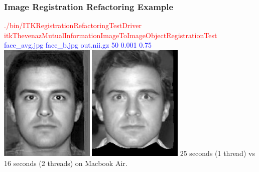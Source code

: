 \begin{frame}
\frametitle{Image Registration Refactoring Example}
\textcolor{red}{./bin/ITKRegistrationRefactoringTestDriver itkThevenazMutualInformationImageToImageObjectRegistrationTest }\\
\textcolor{blue}{face\_avg.jpg face\_b.jpg out.nii.gz  50 0.001 0.75 }\\
\includegraphics[height=2.2in]{../Art/face_avg.jpg}
\includegraphics[height=2.2in]{../Art/face_b_to_face_avg.jpg}
\vskip12pt
25 seconds (1 thread) vs 16 seconds (2 threads) on Macbook Air.
\end{frame}

